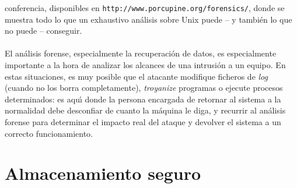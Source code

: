 conferencia, disponibles en {\tt http://www.porcupine.org/forensics/}, donde
se muestra todo lo que un exhaustivo an\'alisis sobre Unix puede -- y tambi\'en
lo que no puede -- conseguir.\\
\\El an\'alisis forense, especialmente la recuperaci\'on de datos, es 
especialmente importante a la hora de analizar los alcances de una intrusi\'on
a un equipo. En estas situaciones, es muy posible que el atacante modifique
ficheros de {\it log} (cuando no los borra completamente), {\it troyanize} 
programas o ejecute procesos determinados: es aqu\'{\i} donde la persona 
encargada de retornar al sistema a la normalidad debe desconfiar de cuanto 
la m\'aquina le diga, y recurrir al an\'alisis forense para determinar el 
impacto real del ataque y devolver el sistema a un correcto funcionamiento.
\section{Almacenamiento seguro}
